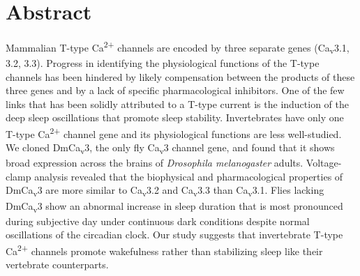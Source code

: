 \section*{Abstract}

Mammalian T-type Ca\textsuperscript{2+} channels are encoded by three separate genes (Ca\textsubscript{v}3.1, 3.2, 3.3).
Progress in identifying the physiological functions of the T-type channels has been hindered by likely compensation between the products of these three genes and by a lack of specific pharmacological inhibitors.
One of the few links that has been solidly attributed to a T-type current is the induction of the deep sleep oscillations that promote sleep stability.
Invertebrates have only one T-type Ca\textsuperscript{2+} channel gene and its physiological functions are less well-studied.
We cloned DmCa\textsubscript{v}3, the only fly Ca\textsubscript{v}3 channel gene, and found that it shows broad expression across the brains of \emph{Drosophila melanogaster} adults.
Voltage-clamp analysis revealed that the biophysical and pharmacological properties of DmCa\textsubscript{v}3 are more similar to Ca\textsubscript{v}3.2 and Ca\textsubscript{v}3.3 than Ca\textsubscript{v}3.1.
Flies lacking DmCa\textsubscript{v}3 show an abnormal increase in sleep duration that is most pronounced during subjective day under continuous dark conditions despite normal oscillations of the circadian clock.
Our study suggests that invertebrate T-type Ca\textsuperscript{2+} channels promote wakefulness rather than stabilizing sleep like their vertebrate counterparts.